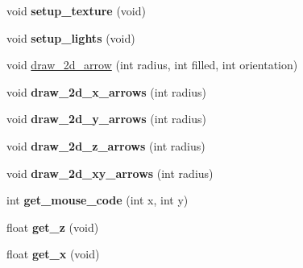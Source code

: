 \begin{DoxyCompactItemize}
\item 
\hypertarget{classGLUI__Translation_a1ad1f0412c0c4668701dee4dc03ef07f}{void {\bfseries setup\-\_\-texture} (void)}\label{classGLUI__Translation_a1ad1f0412c0c4668701dee4dc03ef07f}

\item 
\hypertarget{classGLUI__Translation_a4f8bc171843cccb40d645f7eb955f4af}{void {\bfseries setup\-\_\-lights} (void)}\label{classGLUI__Translation_a4f8bc171843cccb40d645f7eb955f4af}

\item 
void \hyperlink{classGLUI__Translation_afc0c9da0f9ef84a04bbe11948e154a5c}{draw\-\_\-2d\-\_\-arrow} (int radius, int filled, int orientation)
\item 
\hypertarget{classGLUI__Translation_af7263c8185a6a5320a74310e1f4856b6}{void {\bfseries draw\-\_\-2d\-\_\-x\-\_\-arrows} (int radius)}\label{classGLUI__Translation_af7263c8185a6a5320a74310e1f4856b6}

\item 
\hypertarget{classGLUI__Translation_a1ce40628f56baf117cd9c616efaeff6e}{void {\bfseries draw\-\_\-2d\-\_\-y\-\_\-arrows} (int radius)}\label{classGLUI__Translation_a1ce40628f56baf117cd9c616efaeff6e}

\item 
\hypertarget{classGLUI__Translation_aa639401a16c5160b758ab8a5ccfd4a3d}{void {\bfseries draw\-\_\-2d\-\_\-z\-\_\-arrows} (int radius)}\label{classGLUI__Translation_aa639401a16c5160b758ab8a5ccfd4a3d}

\item 
\hypertarget{classGLUI__Translation_a6e9b8fcb46e704c0131b42b3ef56165c}{void {\bfseries draw\-\_\-2d\-\_\-xy\-\_\-arrows} (int radius)}\label{classGLUI__Translation_a6e9b8fcb46e704c0131b42b3ef56165c}

\item 
\hypertarget{classGLUI__Translation_a6f1d169e372f206c7d9299d75b0508bf}{int {\bfseries get\-\_\-mouse\-\_\-code} (int x, int y)}\label{classGLUI__Translation_a6f1d169e372f206c7d9299d75b0508bf}

\item 
\hypertarget{classGLUI__Translation_a0c2156978610e8012928e3bb906d8352}{float {\bfseries get\-\_\-z} (void)}\label{classGLUI__Translation_a0c2156978610e8012928e3bb906d8352}

\item 
\hypertarget{classGLUI__Translation_ac3c6c8da177d6cb841c65a8f1ae33ebc}{float {\bfseries get\-\_\-x} (void)}\label{classGLUI__Translation_ac3c6c8da177d6cb841c65a8f1ae33ebc}


\end{DoxyCompactItemize}
